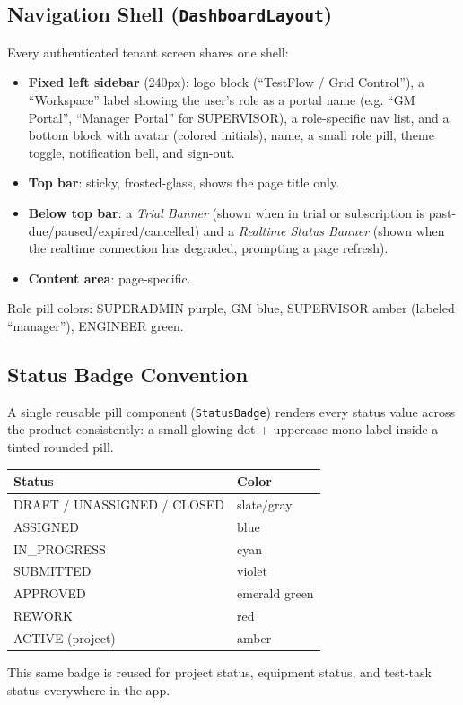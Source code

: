 \documentclass[11pt]{article}
\begin{document}
\subsection{Navigation Shell (\texttt{DashboardLayout})}
Every authenticated tenant screen shares one shell:
\begin{itemize}[nosep]
  \item \textbf{Fixed left sidebar} (240px): logo block (``TestFlow / Grid Control''), a
    ``Workspace'' label showing the user's role as a portal name (e.g. ``GM Portal'',
    ``Manager Portal'' for SUPERVISOR), a role-specific nav list, and a bottom block with
    avatar (colored initials), name, a small role pill, theme toggle, notification bell, and
    sign-out.
  \item \textbf{Top bar}: sticky, frosted-glass, shows the page title only.
  \item \textbf{Below top bar}: a \emph{Trial Banner} (shown when in trial or subscription is
    past-due/paused/expired/cancelled) and a \emph{Realtime Status Banner} (shown when the
    realtime connection has degraded, prompting a page refresh).
  \item \textbf{Content area}: page-specific.
\end{itemize}
Role pill colors: SUPERADMIN purple, GM blue, SUPERVISOR amber (labeled ``manager''), ENGINEER
green.

\subsection{Status Badge Convention}
A single reusable pill component (\texttt{StatusBadge}) renders every status value across the
product consistently: a small glowing dot + uppercase mono label inside a tinted rounded pill.
\begin{center}
\begin{tabular}{ll}
\toprule
Status & Color \\
\midrule
DRAFT / UNASSIGNED / CLOSED & slate/gray \\
ASSIGNED & blue \\
IN\_PROGRESS & cyan \\
SUBMITTED & violet \\
APPROVED & emerald green \\
REWORK & red \\
ACTIVE (project) & amber \\
\bottomrule
\end{tabular}
\end{center}
This same badge is reused for project status, equipment status, and test-task status everywhere in
the app.
\end{document}

